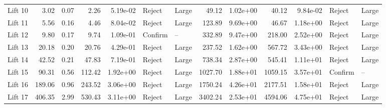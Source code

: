 \begin{tabular}{lrrrrllrrrrll}
 Lift 10 &               3.02 &  0.07 &                2.26 &  5.19e-02 &   Reject &       Large &                    49.12 &  1.02e+00 &                     40.12 &  9.84e-02 &   Reject &       Large \\
 Lift 11 &               5.56 &  0.16 &                4.46 &  8.04e-02 &   Reject &       Large &                   123.89 &  9.69e+00 &                     46.67 &  1.18e+00 &   Reject &       Large \\
 Lift 12 &               9.80 &  0.17 &                9.74 &  1.09e-01 &  Confirm &          -- &                   332.89 &  9.47e+00 &                    218.00 &  2.52e+00 &   Reject &       Large \\
 Lift 13 &              20.18 &  0.20 &               20.76 &  4.29e-01 &   Reject &       Large &                   237.52 &  1.62e+00 &                    567.72 &  3.43e+00 &   Reject &       Large \\
 Lift 14 &              42.52 &  0.21 &               47.83 &  7.19e-01 &   Reject &       Large &                   738.34 &  2.87e+00 &                    545.41 &  1.11e+01 &   Reject &       Large \\
 Lift 15 &              90.31 &  0.56 &              112.42 &  1.92e+00 &   Reject &       Large &                  1027.70 &  1.88e+01 &                   1059.15 &  3.57e+01 &  Confirm &          -- \\
 Lift 16 &             189.06 &  0.96 &              243.52 &  3.06e+00 &   Reject &       Large &                  1750.24 &  4.26e+01 &                   2177.51 &  1.58e+01 &   Reject &       Large \\
 Lift 17 &             406.35 &  2.99 &              530.43 &  3.11e+00 &   Reject &       Large &                  3402.24 &  2.53e+01 &                   4594.06 &  4.75e+01 &   Reject &       Large \\
\bottomrule
\end{tabular}
